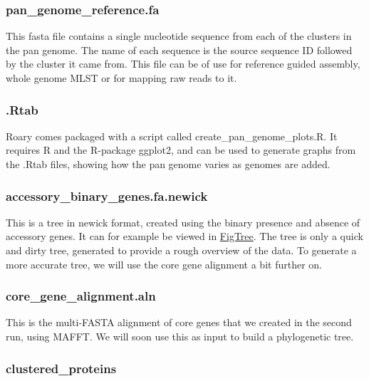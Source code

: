 \documentclass[11pt]{article}
\begin{document}
\hypertarget{pan_genome_reference.fa}{%
\subsubsection{pan\_genome\_reference.fa}\label{pan_genome_reference.fa}}

This fasta file contains a single nucleotide sequence from each of the
clusters in the pan genome. The name of each sequence is the source
sequence ID followed by the cluster it came from. This file can be of
use for reference guided assembly, whole genome MLST or for mapping raw
reads to it.

\hypertarget{rtab}{%
\subsubsection{.Rtab}\label{rtab}}

Roary comes packaged with a script called create\_pan\_genome\_plots.R.
It requires R and the R-package ggplot2, and can be used to generate
graphs from the .Rtab files, showing how the pan genome varies as
genomes are added.

\hypertarget{accessory_binary_genes.fa.newick}{%
\subsubsection{accessory\_binary\_genes.fa.newick}\label{accessory_binary_genes.fa.newick}}

This is a tree in newick format, created using the binary presence and
absence of accessory genes. It can for example be viewed in
\href{http://tree.bio.ed.ac.uk/software/figtree/}{FigTree}. The tree is
only a quick and dirty tree, generated to provide a rough overview of
the data. To generate a more accurate tree, we will use the core gene
alignment a bit further on.

\hypertarget{core_gene_alignment.aln}{%
\subsubsection{core\_gene\_alignment.aln}\label{core_gene_alignment.aln}}

This is the multi-FASTA alignment of core genes that we created in the
second run, using MAFFT. We will soon use this as input to build a
phylogenetic tree.

\hypertarget{clustered_proteins}{%
\subsubsection{clustered\_proteins}\label{clustered_proteins}}
\end{document}
